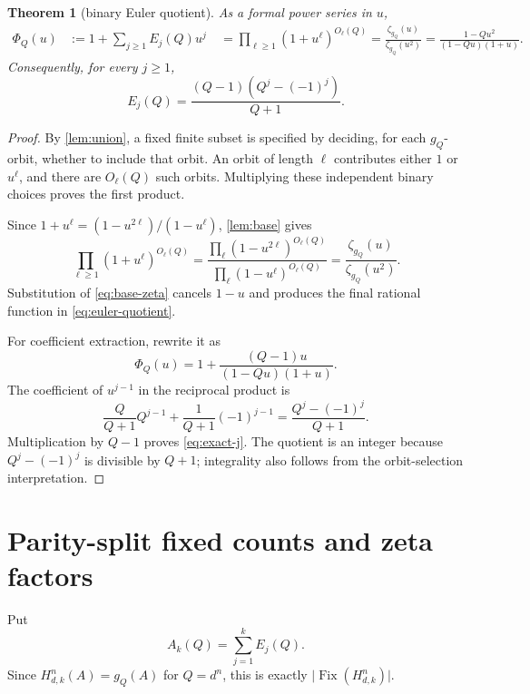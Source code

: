 \documentclass[11pt,a4paper]{amsart}
\newtheorem{theorem}{Theorem}[section]
\theoremstyle{definition}
\theoremstyle{remark}
\newcommand{\Fix}{\operatorname{Fix}}
\newcommand{\card}[1]{\lvert #1\rvert}
\begin{document}
\begin{theorem}[binary Euler quotient]\label{thm:euler}
As a formal power series in $u$,
\begin{align}
 \Phi_Q(u)
 &:=1+\sum_{j\geq1}E_j(Q)u^j \
 &=\prod_{\ell\geq1}(1+u^\ell)^{O_\ell(Q)}
   =\frac{\zeta_{g_Q}(u)}{\zeta_{g_Q}(u^2)}
   =\frac{1-Qu^2}{(1-Qu)(1+u)}.\label{eq:euler-quotient}
\end{align}
Consequently, for every $j\geq1$,
\begin{equation}\label{eq:exact-j}
 E_j(Q)=\frac{(Q-1)(Q^j-(-1)^j)}{Q+1}.
\end{equation}
\end{theorem}

\begin{proof}
By \cref{lem:union}, a fixed finite subset is specified by deciding, for
each $g_Q$-orbit, whether to include that orbit.  An orbit of length $\ell$
contributes either $1$ or $u^\ell$, and there are $O_\ell(Q)$ such orbits.
Multiplying these independent binary choices proves the first product.

Since $1+u^\ell=(1-u^{2\ell})/(1-u^\ell)$, \cref{lem:base} gives
\[
 \prod_{\ell\geq1}(1+u^\ell)^{O_\ell(Q)}
 =\frac{\prod_\ell(1-u^{2\ell})^{O_\ell(Q)}}
        {\prod_\ell(1-u^\ell)^{O_\ell(Q)}}
 =\frac{\zeta_{g_Q}(u)}{\zeta_{g_Q}(u^2)}.
\]
Substitution of \eqref{eq:base-zeta} cancels $1-u$ and produces the final
rational function in \eqref{eq:euler-quotient}.

For coefficient extraction, rewrite it as
\[
 \Phi_Q(u)=1+\frac{(Q-1)u}{(1-Qu)(1+u)}.
\]
The coefficient of $u^{j-1}$ in the reciprocal product is
\[
 \frac{Q}{Q+1}Q^{j-1}+\frac1{Q+1}(-1)^{j-1}
 =\frac{Q^j-(-1)^j}{Q+1}.
\]
Multiplication by $Q-1$ proves \eqref{eq:exact-j}.  The quotient is an
integer because $Q^j-(-1)^j$ is divisible by $Q+1$; integrality also follows
from the orbit-selection interpretation.
\end{proof}

\section{Parity-split fixed counts and zeta factors}

Put
\[
 A_k(Q)=\sum_{j=1}^k E_j(Q).
\]
Since $H_{d,k}^n(A)=g_Q(A)$ for $Q=d^n$, this is exactly
$\card{\Fix(H_{d,k}^n)}$.
\end{document}
